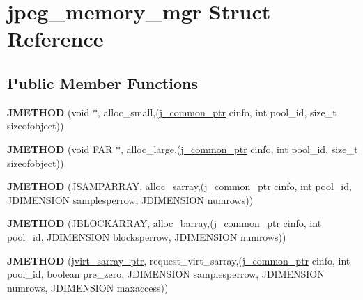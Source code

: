 \hypertarget{structjpeg__memory__mgr}{}\section{jpeg\+\_\+memory\+\_\+mgr Struct Reference}
\label{structjpeg__memory__mgr}
\subsection*{Public Member Functions}
\begin{DoxyCompactItemize}
\item 
\mbox{\label{structjpeg__memory__mgr_ab0d14a0c933c68a7b41ce19339955df5}} 
{\bfseries J\+M\+E\+T\+H\+OD} (void $\ast$, alloc\+\_\+small,(\hyperlink{structjpeg__common__struct}{j\+\_\+common\+\_\+ptr} cinfo, int pool\+\_\+id, size\+\_\+t sizeofobject))
\item 
\mbox{\label{structjpeg__memory__mgr_a2bd073feebce4e1952f2dabd97a0f4dd}} 
{\bfseries J\+M\+E\+T\+H\+OD} (void F\+AR $\ast$, alloc\+\_\+large,(\hyperlink{structjpeg__common__struct}{j\+\_\+common\+\_\+ptr} cinfo, int pool\+\_\+id, size\+\_\+t sizeofobject))
\item 
\mbox{\label{structjpeg__memory__mgr_aa6b3873ddd822e040e8e43da68641244}} 
{\bfseries J\+M\+E\+T\+H\+OD} (J\+S\+A\+M\+P\+A\+R\+R\+AY, alloc\+\_\+sarray,(\hyperlink{structjpeg__common__struct}{j\+\_\+common\+\_\+ptr} cinfo, int pool\+\_\+id, J\+D\+I\+M\+E\+N\+S\+I\+ON samplesperrow, J\+D\+I\+M\+E\+N\+S\+I\+ON numrows))
\item 
\mbox{\label{structjpeg__memory__mgr_a653df295835648406eeb70e2d67b607f}} 
{\bfseries J\+M\+E\+T\+H\+OD} (J\+B\+L\+O\+C\+K\+A\+R\+R\+AY, alloc\+\_\+barray,(\hyperlink{structjpeg__common__struct}{j\+\_\+common\+\_\+ptr} cinfo, int pool\+\_\+id, J\+D\+I\+M\+E\+N\+S\+I\+ON blocksperrow, J\+D\+I\+M\+E\+N\+S\+I\+ON numrows))
\item 
\mbox{\label{structjpeg__memory__mgr_af03ebb0e1791eaae53d7b98ed16b52a1}} 
{\bfseries J\+M\+E\+T\+H\+OD} (\hyperlink{structjvirt__sarray__control}{jvirt\+\_\+sarray\+\_\+ptr}, request\+\_\+virt\+\_\+sarray,(\hyperlink{structjpeg__common__struct}{j\+\_\+common\+\_\+ptr} cinfo, int pool\+\_\+id, boolean pre\+\_\+zero, J\+D\+I\+M\+E\+N\+S\+I\+ON samplesperrow, J\+D\+I\+M\+E\+N\+S\+I\+ON numrows, J\+D\+I\+M\+E\+N\+S\+I\+ON maxaccess))

\end{DoxyCompactItemize}
